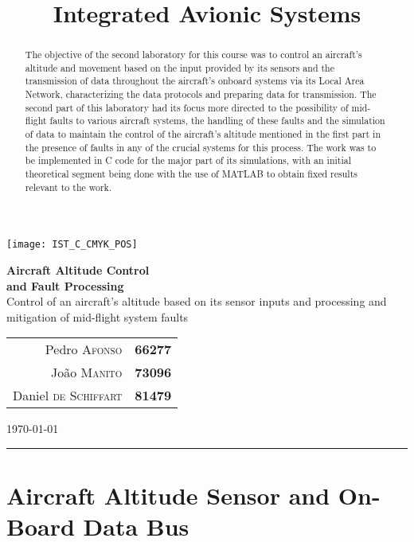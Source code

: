 \documentclass[english,palatino]{ist-report}
\title{Integrated Avionic Systems}
\begin{document}
\thispagestyle{empty}

\begin{center}
	\texttt{[image: IST\_C\_CMYK\_POS]}
	
	\vspace*{3mm}
	{\huge \textbf{Aircraft Altitude Control\\and Fault Processing}} \\
	\vspace*{4mm}
	{\large Control of an aircraft's altitude based on its sensor inputs and processing and mitigation of mid-flight system faults}
	\vspace*{4mm} \\
	\begin{tabular}{r l}
		Pedro \textsc{Afonso} & \textbf{66277} \\
		João \textsc{Manito} & \textbf{73096} \\
		Daniel \textsc{de Schiffart} & \textbf{81479}
	\end{tabular}
	
	\vspace*{3mm}
	{\Large \today}
	\vspace*{4mm} \\
	\rule{\linewidth}{0.5pt}
\end{center}

\begin{abstract}
	The objective of the second laboratory for this course was to control an aircraft's altitude and movement based on the input provided by its sensors and the transmission of data throughout the aircraft's onboard systems via its Local Area Network, characterizing the data protocols and preparing data for transmission. The second part of this laboratory had its focus more directed to the possibility of mid-flight faults to various aircraft systems, the handling of these faults and the simulation of data to maintain the control of the aircraft's altitude mentioned in the first part in the presence of faults in any of the crucial systems for this process. The work was to be implemented in C code for the major part of its simulations, with an initial theoretical segment being done with the use of \textsc{MATLAB} to obtain fixed results relevant to the work.
\end{abstract}

{\hypersetup{linkcolor = black} \tableofcontents}

\part{Aircraft Altitude Sensor and On-Board Data Bus}
\end{document}
